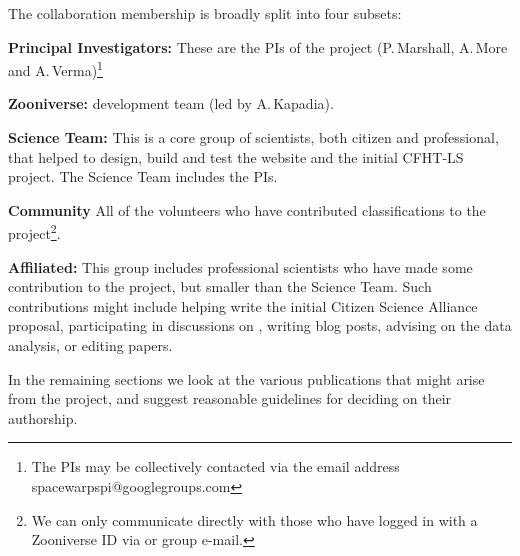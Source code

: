 \documentclass[a4paper]{article}
\begin{document}
The collaboration membership is broadly split into four subsets:

\begin{description}

\item{\bf Principal Investigators:} These are the PIs of the \sw project (P.\,Marshall, 
A.\,More and A.\,Verma)\footnote{The PIs may be collectively contacted via the email address spacewarpspi@googlegroups.com}

\item{\bf Zooniverse:} \sw development team (led by
A.\,Kapadia).

\item{\bf Science Team:} This is a core group of scientists, both citizen and
professional, that helped to design, build and test the \sw website
and the initial CFHT-LS project. The Science Team includes the PIs.

\item{\bf Community} All of the volunteers who have contributed
classifications to the project\footnote{We can only communicate directly with those who have logged in with a Zooniverse ID via \Talk or group e-mail.}.

\item{\bf Affiliated:} This group includes professional scientists who have made some contribution to the \sw project, but smaller than the Science Team. Such contributions might include helping write the initial
Citizen Science Alliance proposal, participating in discussions on
\Talk, writing \sw blog posts, advising on the data analysis, or editing
papers.

\end{description}


In the remaining sections we look at the various publications that might
arise from the \sw project, and suggest reasonable guidelines for
deciding on their authorship. 




\end{document}
